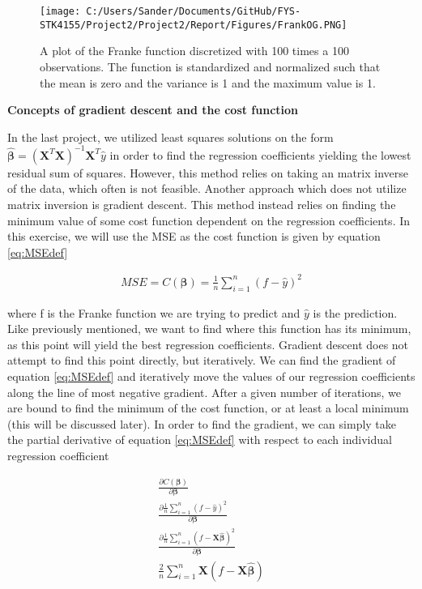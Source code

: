 \documentclass[12pt,a4paper]{article}
\begin{document}
\begin{figure}[H]
\centering
\texttt{[image: C:/Users/Sander/Documents/GitHub/FYS-STK4155/Project2/Project2/Report/Figures/FrankOG.PNG]}
\caption{\label{fig:Franke} A plot of the Franke function discretized with 100 times a 100 observations. The function is standardized and normalized such that the mean is zero and the variance is 1 and the maximum value is 1.}
\end{figure}

\begin{center}
\large{\textbf{Concepts of gradient descent and the cost function}}
\end{center}

\noindent In the last project, we utilized least squares solutions on the form $\boldsymbol{\hat{\beta}} = (\textbf{X}^T\textbf{X})^{-1}\textbf{X}^T\hat{y}$ in order to find the regression coefficients yielding the lowest residual sum of squares. However, this method relies on taking an matrix inverse of the data, which often is not feasible. Another approach which does not utilize matrix inversion is gradient descent. This method instead relies on finding the minimum value of some cost function dependent on the regression coefficients. In this exercise, we will use the MSE as the cost function is given by equation \ref{eq:MSEdef}

\begin{equation}\label{eq:MSEdef}
\begin{aligned}
MSE = C(\boldsymbol{\beta}) = \frac{1}{n}\sum_{i = 1}^n (f - \hat{y})^2
\end{aligned}
\end{equation}

\noindent where f is the Franke function we are trying to predict and $\hat{y}$ is the prediction. Like previously mentioned, we want to find where this function has its minimum, as this point will yield the best regression coefficients. Gradient descent does not attempt to find this point directly, but iteratively. We can find the gradient of equation \ref{eq:MSEdef} and iteratively move the values of our regression coefficients along the line of most negative gradient. After a given number of iterations, we are bound to find the minimum of the cost function, or at least a local minimum (this will be discussed later). In order to find the gradient, we can simply take the partial derivative of equation \ref{eq:MSEdef} with respect to each individual regression coefficient

\begin{equation}\label{eq:MSEder}
\begin{aligned}
\frac{\partial C(\boldsymbol{\beta})}{\partial \boldsymbol{\beta}} 
\\
\frac{\partial \frac{1}{n} \sum_{i = 1}^n (f-\hat{y})^2}{\partial \boldsymbol{\beta}} 
\\
\frac{\partial \frac{1}{n} \sum_{i = 1}^n (f-\textbf{X}\boldsymbol{\hat{\beta}})^2}{\partial \boldsymbol{\beta}} 
\\
\frac{2}{n} \sum_{i = 1}^n \textbf{X}(f - \textbf{X}\boldsymbol{\hat{\beta}}) 
\end{aligned}
\end{equation}
\end{document}
